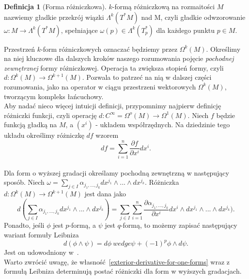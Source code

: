 \documentclass[licencjacka]{pracamgr}
\theoremstyle{definition}
\newtheorem{definition}{Definicja}[section]
\theoremstyle{definition}
\theoremstyle{plain}
\theoremstyle{plain}
\theoremstyle{plain}
\theoremstyle{plain}
\begin{document}
\begin{definition}[Forma różniczkowa]
  $k$-formą różniczkową na rozmaitości $M$ nazwiemy gładkie przekrój wiązki
  $\Lambda^k(T^\ast M)$ nad M, czyli gładkie odwzorowanie $\omega: M \rightarrow
  \Lambda^k (T^\ast M)$, spełniające $\omega(p) \in \Lambda^k(T_p^\ast)$ dla
  każdego punktu $p \in M$.
\end{definition}

Przestrzeń $k$-form różniczkowych oznaczać będziemy przez $\Omega^k(M)$. 
Określimy na niej kluczowe dla dalszych kroków naszego rozumowania pojęcie
\emph{pochodnej zewnętrznej} formy różniczkowej. Operacja ta zwiększa stopień
formy, czyli $d: \Omega^k(M) \rightarrow \Omega^{k+1} (M)$. Pozwala to patrzeć
na nią w dalszej części rozumowania, jako na operator w ciągu przestrzeni
wektorowych $\Omega^k(M)$, tworzącym kompleks łańcuchowy. \\


Aby nadać nieco więcej intuicji definicji, przypomnimy najpierw
definicję różniczki funkcji, czyli operację 
$d: C^\infty = \Omega^o(M) \rightarrow \Omega^1(M)$. Niech $f$ będzie funkcją
gładką na $M$, a $(x^i)$ -  układem współrzędnych. Na dziedzinie tego układu
określimy różniczkę $df$ wzorem
\begin{equation}\label{exterior-derivative-for-one-forms}
df = \sum_{i=1}^n \frac{\partial f}{\partial x^i} dx^i.
\end{equation} \\

Dla form o wyższej gradacji określamy pochodną zewnętrzną w następujący
sposób. Niech 
$\omega = \sum_{j \in I} \alpha_{j_1, ..., j_k} dx^{j_1} \wedge ... \wedge dx^{j_k}$.
Różniczka $d: \Omega^k(M) \rightarrow \Omega^{k+1}(M)$ jest dana jako
\[ %
d( \sum_{j \in I} \alpha_{j_1, ..., j_k} dx^{j_1} \wedge ... \wedge dx^{j_k}) = 
 \sum_{j \in I} \sum_{i=1}^n
 \frac{ \partial \alpha_{j_1, ..., j_k}} {\partial x^i} dx^i
                            \wedge dx^{j_1} \wedge ... \wedge dx^{j_k}).
\]
Ponadto, jeśli $\phi$ jest $p$-formą, a $\psi$ jest $q$-formą, to możemy
zapisać następujący wariant formuły Leibniza
\[
d(\phi \wedge \psi) = d\phi \ wedge \psi + (-1)^p \phi \wedge d\psi.
\]
Jest on udowodniony w~\cite{lee}. \\

Warto zwrócić uwagę, że własność~\ref{exterior-derivative-for-one-forms} wraz z
formułą Leibniza determinują postać różniczki dla form w wyższych gradacjach. \\
\end{document}
